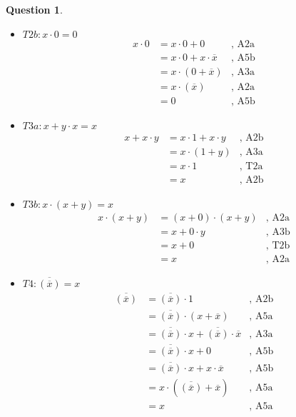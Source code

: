 \documentclass[11pt,a4paper]{article}
\theoremstyle{definition}%
\newtheorem{Q}{Question}[] %
\newcommand{\reponse}[1]{%
	\ifthenelse {\boolean{corrige}} {\fr{\paragraph{Réponse :}}\en{\paragraph{Answer:}} \color{darkblue}   #1\color{black}} {}
 }
\newcommand{\fr}[1]{
 	\ifthenelse {\boolean{fr}} {#1} {}
 }
\newcommand{\en}[1]{
 	\ifthenelse {\boolean{en}} {#1} {}
 }
\begin{document}
\begin{Q}
{\begin{itemize}
	\item $T2b : x \cdot 0=0$
	\begin{align*}
		x \cdot 0 & = x \cdot 0 + 0 &\mbox{, A2a} \\
		& = x \cdot 0 + x \cdot \overline{x}&\mbox{, A5b} \\
		& = x \cdot (0 + \overline{x}) &\mbox{, A3a} \\
		& = x \cdot (\overline{x}) &\mbox{, A2a} \\
		& = 0 &\mbox{, A5b}
	\end{align*}

	\item $T3a : x+y \cdot x=x$
	\begin{align*}
		x + x \cdot y & = x \cdot 1 + x \cdot y &\mbox{, A2b}\\
		& = x \cdot (1 + y)&\mbox{, A3a}\\
		& = x \cdot 1&\mbox{, T2a} \\
		& = x &\mbox{, A2b}
	\end{align*}

	\item $T3b : x \cdot (x+y)=x$
	\begin{align*}
		x \cdot (x+y) & = (x+0) \cdot (x+y) &\mbox{, A2a}\\
		& = x + 0 \cdot y &\mbox{, A3b}\\
		& = x + 0 &\mbox{, T2b} \\
		& = x &\mbox{, A2a}
	\end{align*}

	\item $T4 : \overline{(\overline{x})}=x$
	\begin{align*}
		\overline{(\overline{x})} & = \overline{(\overline{x})} \cdot 1 &\mbox{, A2b}\\
		& = \overline{(\overline{x})} \cdot (x + \overline{x}) &\mbox{, A5a}\\
		& = \overline{(\overline{x})} \cdot x + \overline{(\overline{x})} \cdot \overline{x} &\mbox{, A3a}\\
		& = \overline{(\overline{x})} \cdot x + 0 &\mbox{, A5b}\\
		& = \overline{(\overline{x})} \cdot x + x \cdot \overline{x} &\mbox{, A5b}\\
		& = x\cdot (\overline{(\overline{x})} + \overline{x})&\mbox{, A5a}\\
		& = x&\mbox{, A5a}\\
	\end{align*}
\end{itemize}
}

\end{Q}
%


\end{document}
